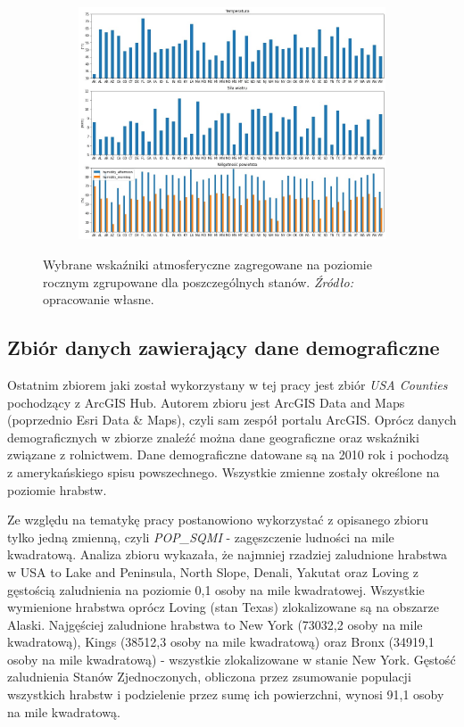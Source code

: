 \documentclass[polish, twoside, 12pt, a4paper]{article}
\theoremstyle{definition}
\theoremstyle{plain}
\theoremstyle{remark}
\begin{document}
\begin{figure}[H]
  \centering
  \begin{subfigure}[t]{\textwidth}
    \includegraphics[width=15cm]{atm-all.jpg}
  \end{subfigure}
  \captionsetup{margin=10pt,font=small,labelfont=bf,width=.8\textwidth}
  \caption{Wybrane wskaźniki atmosferyczne zagregowane na poziomie rocznym zgrupowane dla poszczególnych stanów. \textit{Źródło:} opracowanie własne.}\label{fig:figure:xx4}
\end{figure}

\subsection{Zbiór danych zawierający dane demograficzne}

Ostatnim zbiorem jaki został wykorzystany w tej pracy jest zbiór \emph{USA Counties} pochodzący z ArcGIS Hub. Autorem zbioru jest ArcGIS Data and Maps (poprzednio Esri Data \& Maps), czyli sam zespół portalu ArcGIS. Oprócz danych demograficznych w zbiorze znaleźć można dane geograficzne oraz wskaźniki związane z rolnictwem. Dane demograficzne datowane są na 2010 rok i pochodzą z amerykańskiego spisu powszechnego. Wszystkie zmienne zostały określone na poziomie hrabstw.

Ze względu na tematykę pracy postanowiono wykorzystać z opisanego zbioru tylko jedną zmienną, czyli \emph{POP\_SQMI} - zagęszczenie ludności na mile kwadratową. Analiza zbioru wykazała, że najmniej rzadziej zaludnione hrabstwa w USA to Lake and Peninsula, North Slope, Denali, Yakutat oraz Loving z gęstością zaludnienia na poziomie 0,1 osoby na mile kwadratowej. Wszystkie wymienione hrabstwa oprócz Loving (stan Texas) zlokalizowane są na obszarze Alaski. Najgęściej zaludnione hrabstwa to New York (73032,2 osoby na mile kwadratową), Kings (38512,3 osoby na mile kwadratową) oraz Bronx (34919,1 osoby na mile kwadratową) - wszystkie zlokalizowane w stanie New York. Gęstość zaludnienia Stanów Zjednoczonych, obliczona przez zsumowanie populacji wszystkich hrabstw i podzielenie przez sumę ich powierzchni, wynosi 91,1 osoby na mile kwadratową.
\end{document}
